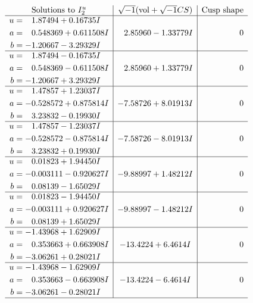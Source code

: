 \documentclass[1p]{elsarticle_modified}
\theoremstyle{definition}
\newcommand{\I}{\sqrt{-1}}
\begin{document}
$$\begin{array}{c|c|c}
\text{Solutions to }I^u_{2}& \I (\text{vol} + \sqrt{-1}CS) & \text{Cusp shape}\\
 \hline 
\begin{aligned}
u &= \phantom{-}1.87494 + 0.16735 I \\
a &= \phantom{-}0.548369 + 0.611508 I \\
b &= -1.20667 - 3.29329 I\end{aligned}
 & \phantom{-}2.85960 - 1.33779 I & \phantom{-0.000000 } 0 \\ \hline\begin{aligned}
u &= \phantom{-}1.87494 - 0.16735 I \\
a &= \phantom{-}0.548369 - 0.611508 I \\
b &= -1.20667 + 3.29329 I\end{aligned}
 & \phantom{-}2.85960 + 1.33779 I & \phantom{-0.000000 } 0 \\ \hline\begin{aligned}
u &= \phantom{-}1.47857 + 1.23037 I \\
a &= -0.528572 + 0.875814 I \\
b &= \phantom{-}3.23832 - 0.19930 I\end{aligned}
 & -7.58726 + 8.01913 I & \phantom{-0.000000 } 0 \\ \hline\begin{aligned}
u &= \phantom{-}1.47857 - 1.23037 I \\
a &= -0.528572 - 0.875814 I \\
b &= \phantom{-}3.23832 + 0.19930 I\end{aligned}
 & -7.58726 - 8.01913 I & \phantom{-0.000000 } 0 \\ \hline\begin{aligned}
u &= \phantom{-}0.01823 + 1.94450 I \\
a &= -0.003111 - 0.920627 I \\
b &= \phantom{-}0.08139 - 1.65029 I\end{aligned}
 & -9.88997 + 1.48212 I & \phantom{-0.000000 } 0 \\ \hline\begin{aligned}
u &= \phantom{-}0.01823 - 1.94450 I \\
a &= -0.003111 + 0.920627 I \\
b &= \phantom{-}0.08139 + 1.65029 I\end{aligned}
 & -9.88997 - 1.48212 I & \phantom{-0.000000 } 0 \\ \hline\begin{aligned}
u &= -1.43968 + 1.62909 I \\
a &= \phantom{-}0.353663 + 0.663908 I \\
b &= -3.06261 + 0.28021 I\end{aligned}
 & -13.4224 + 6.4614 I & \phantom{-0.000000 } 0 \\ \hline\begin{aligned}
u &= -1.43968 - 1.62909 I \\
a &= \phantom{-}0.353663 - 0.663908 I \\
b &= -3.06261 - 0.28021 I\end{aligned}
 & -13.4224 - 6.4614 I & \phantom{-0.000000 } 0\\
 \hline 
 \end{array}$$\newpage\newpage\renewcommand{\arraystretch}{1}
\end{document}
